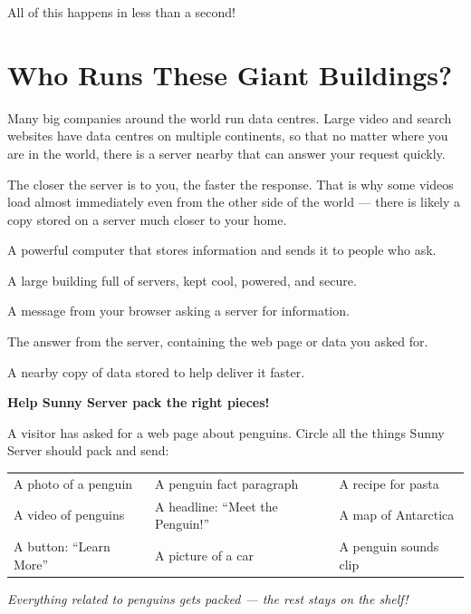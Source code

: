 All of this happens in less than a second!

\sectionrule

\section*{Who Runs These Giant Buildings?}

Many big companies around the world run data centres.
Large video and search websites have data centres on multiple continents,
so that no matter where you are in the world,
there is a server nearby that can answer your request quickly.

The closer the server is to you, the faster the response.
That is why some videos load almost immediately even from the other side of the world —
there is likely a copy stored on a server much closer to your home.

\sectionrule

\begin{newwords}
  \begin{description}[labelwidth=3.5cm, leftmargin=3.7cm]
    \item[\term{Server}]       A powerful computer that stores information and sends it to people who ask.
    \item[\term{Data centre}]  A large building full of servers, kept cool, powered, and secure.
    \item[\term{Request}]      A message from your browser asking a server for information.
    \item[\term{Response}]     The answer from the server, containing the web page or data you asked for.
    \item[\term{Cache}]        A nearby copy of data stored to help deliver it faster.
  \end{description}
\end{newwords}

\sectionrule

\begin{tryit}
  \textbf{Help Sunny Server pack the right pieces!}

  A visitor has asked for a web page about penguins.
  Circle all the things Sunny Server should pack and send:

  \begin{center}
    \begin{tabularx}{\linewidth}{Y Y Y}
      A photo of a penguin & A penguin fact paragraph & A recipe for pasta \\
      A video of penguins & A headline: ``Meet the Penguin!'' & A map of Antarctica \\
      A button: ``Learn More'' & A picture of a car & A penguin sounds clip \\
    \end{tabularx}
  \end{center}

  \emph{Everything related to penguins gets packed — the rest stays on the shelf!}
\end{tryit}

